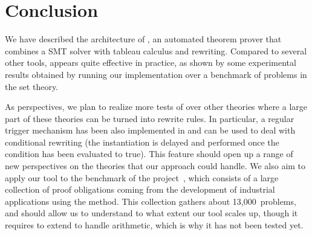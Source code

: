 
\section{Conclusion}

We have described the architecture of \archsat{}, an automated theorem prover
that combines a SMT solver with tableau calculus and rewriting. Compared to
several other tools, \archsat{} appears quite effective in practice, as shown by
some experimental results obtained by running our implementation over a
benchmark of problems in the \bmth{} set theory.

As perspectives, we plan to realize more tests of \archsat{} over other theories
where a large part of these theories can be turned into rewrite rules. In
particular, a regular trigger mechanism has been also implemented in \archsat{}
and can be used to deal with conditional rewriting (the instantiation is delayed
and performed once the condition has been evaluated to true). This feature
should open up a range of new perspectives on the theories that our approach
could handle. We also aim to apply our tool to the benchmark of the \bware{}
project~\cite{BWare}, which consists of a large collection of proof obligations
coming from the development of industrial applications using the \bmth{} method.
This collection gathers about 13,000~problems, and should allow us to understand
to what extent our tool scales up, though it requires to extend \archsat{} to
handle arithmetic, which is why it has not been tested yet.
